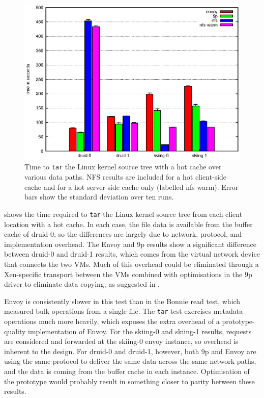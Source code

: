 \begin{figure}[t]
\centering
\includegraphics[width=\figwidth]{figures/arch-tar-hot}
\caption[\texttt{tar} benchmark results with a hot cache]{Time to \texttt{tar} the Linux kernel source tree with a hot cache over various data paths. NFS results are included for a hot client-side cache and for a hot server-side cache only (labelled nfs-warm). Error bars show the standard deviation over ten runs.}
\label{fig:arch-tar-hot}
\end{figure}

 shows the time required to \texttt{tar} the Linux kernel source tree from each client location with a hot cache. In each case, the file data is available from the buffer cache of druid-0, so the differences are largely due to network, protocol, and implementation overhead. The Envoy and 9p results show a significant difference between druid-0 and druid-1 results, which comes from the virtual network device that connects the two VMs. Much of this overhead could be eliminated through a Xen-specific transport between the VMs combined with optimisations in the 9p driver to eliminate data copying, as suggested in .

Envoy is consistently slower in this test than in the Bonnie read test, which measured bulk operations from a single file. The \texttt{tar} test exercises metadata operations much more heavily, which exposes the extra overhead of a prototype-quality implementation of Envoy. For the skiing-0 and skiing-1 results, requests are considered and forwarded at the skiing-0 envoy instance, so overhead is inherent to the design. For druid-0 and druid-1, however, both 9p and Envoy are using the same protocol to deliver the same data across the same network paths, and the data is coming from the buffer cache in each instance. Optimisation of the prototype would probably result in something closer to parity between these results.

